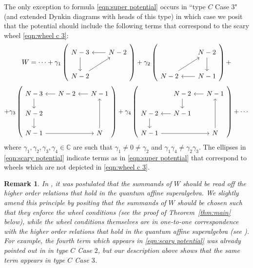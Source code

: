 \documentclass{amsart}
\newtheorem{remark}[subsection]{Remark}
\def\BC{{\mathbb{C}}}
\begin{document}
\medskip 

\noindent The only exception to formula \eqref{eqn:super potential} occurs in ``type $C$ Case $3$" (and extended Dynkin diagrams with heads of this type) in which case we posit that the potential should include the following terms that correspond to the scary wheel \eqref{eqn:wheel c 3}:
\begin{equation}
\label{eqn:scary potential}
W = \cdots + \gamma_1 \left( \begin{tikzcd}[row sep=2em, column sep=2em]
N-3 & N-2 \\ 
N-2 
\arrow[from=1-1, to=2-1]
\arrow[from=1-2, to=1-1]
\arrow[from=2-1, to=1-2]
\end{tikzcd} \right) + \gamma_2 \left(\begin{tikzcd}[row sep=2em, column sep=2em]
 & N-2 \\ 
N-2 & N-1
\arrow[from=1-2, to=2-2]
\arrow[from=2-2, to=2-1]
\arrow[from=2-1, to=1-2]
\end{tikzcd} \right) +
\end{equation}
\[
+ \gamma_3 \left( \begin{tikzcd}[row sep=1.5em, column sep=1.5em]
N-3 & N-2 & N-1 \\ 
N-2 & \\
N-1 && N
\arrow[from=3-1, to=3-3]
\arrow[from=3-3, to=1-3]
\arrow[from=1-3, to=1-2]
\arrow[from=2-1, to=3-1]
\arrow[from=1-1, to=2-1]
\arrow[from=1-2, to=1-1]
\end{tikzcd} \right)
+ \gamma_4 \left(\begin{tikzcd}[row sep=1.5em, column sep=1.5em]
& N-2 & N-1 \\ 
N-2 & N-1 \\
N-1 && N
\arrow[from=3-1, to=3-3]
\arrow[from=3-3, to=1-3]
\arrow[from=1-3, to=1-2]
\arrow[from=1-2, to=2-2]
\arrow[from=2-1, to=3-1]
\arrow[from=2-2, to=2-1]
\end{tikzcd} \right) + \cdots
\]
where $\gamma_1,\gamma_2,\gamma_3,\gamma_4 \in \BC$ are such that $\gamma_1 \neq 0 \neq \gamma_2$ and $\gamma_1\gamma_4 \neq \gamma_2\gamma_3$. The ellipses in \eqref{eqn:scary potential} indicate terms as in \eqref{eqn:super potential} that correspond to wheels which are not depicted in \eqref{eqn:wheel c 3}.

\medskip 

\begin{remark}

In \cite{Bao}, it was postulated that the summands of $W$ should be read off the higher order relations that hold in the quantum affine superalgebra. We slightly amend this principle by positing that the summands of $W$ should be chosen such that they enforce the wheel conditions (see the proof of Theorem~\ref{thm:main} below), while the wheel conditions themselves are in one-to-one correspondence with the higher order relations that hold in the quantum affine superalgebra (see \cite{N Arb}). For example, the fourth term which appears in \eqref{eqn:scary potential} was already pointed out in \cite{Bao} in type $C$ Case $2$, but our description above shows that the same term appears in type $C$ Case $3$.
	
\end{remark}
\end{document}
